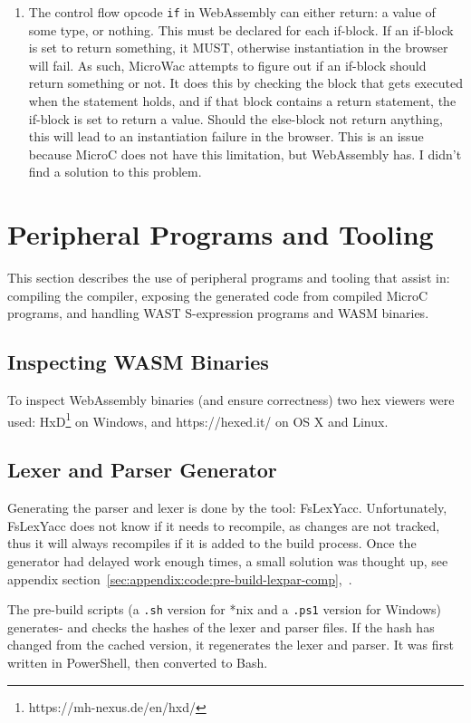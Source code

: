 \documentclass[a4paper]{article}
\begin{document}
\begin{enumerate}
	\item The control flow opcode \texttt{if} in WebAssembly can either return: a value of some type, or nothing. This must be declared for each if-block. If an if-block is set to return something, it MUST, otherwise instantiation in the browser will fail. As such, MicroWac attempts to figure out if an if-block should return something or not. It does this by checking the block that gets executed when the statement holds, and if that block contains a return statement, the if-block is set to return a value. Should the else-block not return anything, this will lead to an instantiation failure in the browser. This is an issue because MicroC does not have this limitation, but WebAssembly has. I didn't find a solution to this problem.
\end{enumerate}

\newpage
\section{Peripheral Programs and Tooling}
\label{sec:peripherals}
This section describes the use of peripheral programs and tooling that assist in: compiling the compiler, exposing the generated code from compiled MicroC programs, and handling WAST S-expression programs and WASM binaries.

\subsection{Inspecting WASM Binaries}
\label{sec:peripherals:inspecting-wasm}
To inspect WebAssembly binaries (and ensure correctness) two hex viewers were used: HxD\footnote{https://mh-nexus.de/en/hxd/} on Windows, and https://hexed.it/ on OS X and Linux.

\subsection{Lexer and Parser Generator}
\label{sec:peripherals:lexpargen}
Generating the parser and lexer is done by the tool: FsLexYacc. Unfortunately, FsLexYacc does not know if it needs to recompile, as changes are not tracked, thus it will always recompiles if it is added to the build process. Once the generator had delayed work enough times, a small solution was thought up, see appendix section~\ref{sec:appendix:code:pre-build-lexpar-comp},~.

The pre-build scripts (a \texttt{.sh} version for *nix and a \texttt{.ps1} version for Windows) generates- and checks the hashes of the lexer and parser files. If the hash has changed from the cached version, it regenerates the lexer and parser. It was first written in PowerShell, then converted to Bash.
\end{document}
